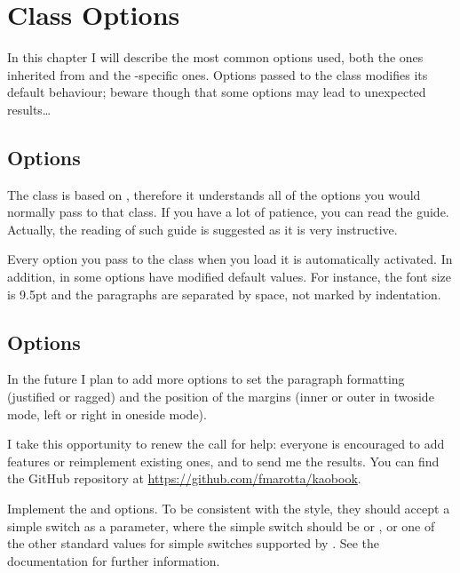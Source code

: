 \setchapterpreamble[u]{\margintoc}
\chapter{Class Options}

In this chapter I will describe the most common options used, both the 
ones inherited from  and the -specific ones. 
Options passed to the class modifies its default behaviour; beware 
though that some options may lead to unexpected results\ldots

\section{ Options}

The  class is based on , therefore it 
understands all of the options you would normally pass to that class. If 
you have a lot of patience, you can read the \KOMAScript\xspace 
guide. Actually, the reading 
of such guide is suggested as it is very instructive.

Every \KOMAScript\xspace option you pass to the class when you load it 
is automatically activated. In addition, in  some options 
have modified default values. For instance, the font size is 9.5pt and 
the paragraphs are separated by space, not marked by indentation.

\section{ Options}

In the future I plan to add more options to set the paragraph formatting 
(justified or ragged) and the position of the margins (inner or outer in 
twoside mode, left or right in oneside mode).

I take this opportunity to renew the call for help: everyone is 
encouraged to add features or reimplement existing ones, and to send me 
the results. You can find the GitHub repository at 
\url{https://github.com/fmarotta/kaobook}.

\begin{kaobox}[frametitle=To Do]
Implement the  and  options. To be 
consistent with the \KOMAScript\xspace style, they should accept a 
simple switch as a parameter, where the simple switch should be 
 or , or one of the other standard values for 
simple switches supported by \KOMAScript. See the \KOMAScript\xspace 
documentation for further information.
\end{kaobox}

